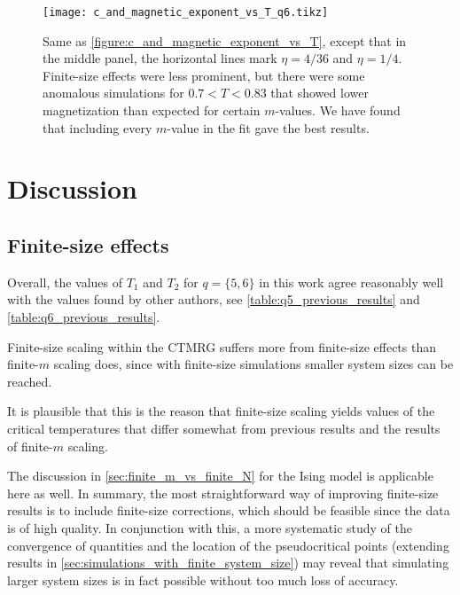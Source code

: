 \begin{figure}
  \centering
  \texttt{[image: c\_and\_magnetic\_exponent\_vs\_T\_q6.tikz]}
  \caption{Same as \autoref{figure:c_and_magnetic_exponent_vs_T}, except that in the middle panel,
  the horizontal lines mark $\eta = 4/36$ and $\eta = 1/4$.
  Finite-size effects were less prominent, but there were some anomalous simulations for $0.7 < T < 0.83$ that showed
  lower magnetization than expected for certain $m$-values.
  We have found that including every $m$-value in the fit gave the best results.
}\label{figure:c_and_magnetic_exponent_vs_T_q6}
\end{figure}


\section{Discussion}

\subsection{Finite-size effects}

Overall, the values of $T_1$ and $T_2$ for $q = \{ 5, 6 \}$ in this work agree reasonably well with the values found by
other authors, see \autoref{table:q5_previous_results} and \autoref{table:q6_previous_results}.

Finite-size scaling within the CTMRG suffers more from finite-size effects than finite-$m$ scaling does,
since with finite-size simulations smaller system sizes can be reached.

It is plausible that this is the reason that finite-size scaling yields values of the critical temperatures that differ
somewhat from previous results and the results of finite-$m$ scaling.

The discussion in \autoref{sec:finite_m_vs_finite_N} for the Ising model is applicable here as well. In summary,
the most straightforward way of improving finite-size results is to include finite-size corrections,
which should be feasible since the data is of high quality.
In conjunction with this, a more systematic study of the convergence of quantities and the location of the
pseudocritical points (extending results in \autoref{sec:simulations_with_finite_system_size}) may reveal that
simulating larger system sizes is in fact possible without too much loss of accuracy.

